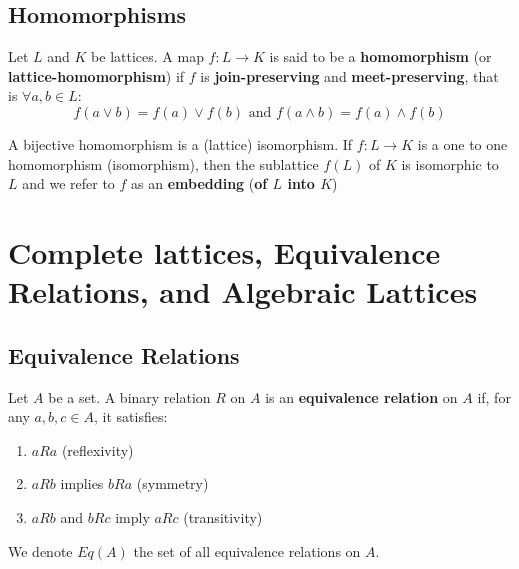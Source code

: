 \subsection{Homomorphisms}

\begin{definition}[homomorphism] Let $L$ and $K$ be lattices. A map $f: L
\rightarrow K$ is said to be a \textbf{homomorphism} (or
\textbf{lattice-homomorphism}) if $f$ is \textbf{join-preserving} and
\textbf{meet-preserving}, that is $\forall a,b \in L$:
\begin{equation*} f(a \lor b) = f(a) \lor f(b) \text{ and } f(a \land b) = f(a)
\land f(b)
\end{equation*}

A bijective homomorphism is a (lattice) isomorphism. If $f: L \rightarrow K$ is
a one to one homomorphism (isomorphism), then the sublattice $f(L)$ of $K$ is
isomorphic to $L$ and we refer to $f$ as an \textbf{embedding} (\textbf{of $L$
into $K$})
\end{definition}

\section{Complete lattices, Equivalence Relations, and Algebraic Lattices}

\subsection{Equivalence Relations}

\begin{definition} Let $A$ be a set. A binary relation $R$
on $A$ is an \textbf{equivalence relation} on $A$ if, for any $a,b,c \in A$, it
satisfies:
  \begin{enumerate}
  \item $aRa$ (reflexivity)
  \item $aRb$ implies $bRa$ (symmetry)
  \item $aRb$ and $bRc$ imply $aRc$ (transitivity)
  \end{enumerate}

  We denote $Eq(A)$ the set of all equivalence relations on $A$.
\end{definition}

